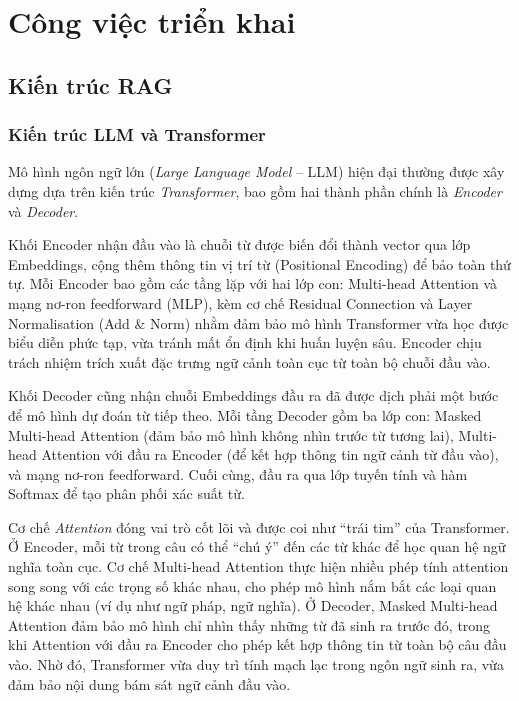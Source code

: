 \chapter{Công việc triển khai}

\section{Kiến trúc RAG}

\subsection{Kiến trúc LLM và Transformer}

{Mô hình ngôn ngữ lớn} (\emph{Large Language Model} -- LLM) hiện đại thường được xây dựng dựa trên kiến trúc \emph{Transformer}, bao gồm hai thành phần chính là \emph{Encoder} và \emph{Decoder}.

Khối {Encoder} nhận đầu vào là chuỗi từ được biến đổi thành vector qua lớp Embeddings, cộng thêm thông tin vị trí từ (Positional Encoding) để bảo toàn thứ tự. Mỗi Encoder bao gồm các tầng lặp với hai lớp con: Multi-head Attention và mạng nơ-ron feedforward (MLP), kèm cơ chế Residual Connection và Layer Normalisation (Add \& Norm) nhằm đảm bảo mô hình Transformer vừa học được biểu diễn phức tạp, vừa tránh mất ổn định khi huấn luyện sâu. Encoder chịu trách nhiệm trích xuất đặc trưng ngữ cảnh toàn cục từ toàn bộ chuỗi đầu vào.

Khối {Decoder} cũng nhận chuỗi Embeddings đầu ra đã được dịch phải một bước để mô hình dự đoán từ tiếp theo. Mỗi tầng Decoder gồm ba lớp con: Masked Multi-head Attention (đảm bảo mô hình không nhìn trước từ tương lai), Multi-head Attention với đầu ra Encoder (để kết hợp thông tin ngữ cảnh từ đầu vào), và mạng nơ-ron feedforward. Cuối cùng, đầu ra qua lớp tuyến tính và hàm Softmax để tạo phân phối xác suất từ.

Cơ chế \emph{Attention} đóng vai trò cốt lõi và được coi như ``trái tim'' của Transformer. Ở Encoder, mỗi từ trong câu có thể ``chú ý'' đến các từ khác để học quan hệ ngữ nghĩa toàn cục. Cơ chế Multi-head Attention thực hiện nhiều phép tính attention song song với các trọng số khác nhau, cho phép mô hình nắm bắt các loại quan hệ khác nhau (ví dụ như ngữ pháp, ngữ nghĩa). Ở Decoder, Masked Multi-head Attention đảm bảo mô hình chỉ nhìn thấy những từ đã sinh ra trước đó, trong khi Attention với đầu ra Encoder cho phép kết hợp thông tin từ toàn bộ câu đầu vào. Nhờ đó, Transformer vừa duy trì tính mạch lạc trong ngôn ngữ sinh ra, vừa đảm bảo nội dung bám sát ngữ cảnh đầu vào.

